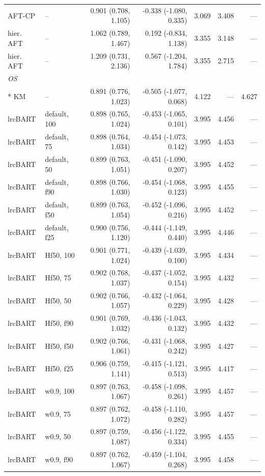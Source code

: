 \begin{landscape}
\begin{longtable}{llrrrrr}
AFT-CP & -- & 0.901 (0.708, 1.105) & -0.338 (-1.080, 0.335) & 3.069 & 3.408 & --- \\
hier. AFT & -- & 1.062 (0.789, 1.467) & 0.192 (-0.834, 1.138) & 3.355 & 3.148 & --- \\
hier. AFT & -- & 1.209 (0.731, 2.136) & 0.567 (-1.204, 1.784) & 3.355 & 2.715 & --- \\
\multicolumn{7}{l}{\strut\textit{OS}}\\*
KM & -- & 0.891 (0.776, 1.023) & -0.505 (-1.077, 0.068) & 4.122 & --- & 4.627 \\
lrcBART & default, 100 & 0.898 (0.765, 1.024) & -0.453 (-1.065, 0.101) & 3.995 & 4.456 & --- \\
lrcBART & default, 75 & 0.898 (0.764, 1.034) & -0.454 (-1.073, 0.142) & 3.995 & 4.453 & --- \\
lrcBART & default, 50 & 0.899 (0.763, 1.051) & -0.451 (-1.090, 0.207) & 3.995 & 4.452 & --- \\
lrcBART & default, f90 & 0.898 (0.766, 1.030) & -0.454 (-1.068, 0.123) & 3.995 & 4.455 & --- \\
lrcBART & default, f50 & 0.899 (0.763, 1.054) & -0.452 (-1.096, 0.216) & 3.995 & 4.452 & --- \\
lrcBART & default, f25 & 0.900 (0.756, 1.120) & -0.444 (-1.149, 0.440) & 3.995 & 4.446 & --- \\
lrcBART & Hf50, 100 & 0.901 (0.771, 1.024) & -0.439 (-1.039, 0.100) & 3.995 & 4.434 & --- \\
lrcBART & Hf50, 75 & 0.902 (0.768, 1.037) & -0.437 (-1.052, 0.154) & 3.995 & 4.432 & --- \\
lrcBART & Hf50, 50 & 0.902 (0.766, 1.057) & -0.432 (-1.064, 0.229) & 3.995 & 4.428 & --- \\
lrcBART & Hf50, f90 & 0.901 (0.769, 1.032) & -0.436 (-1.043, 0.132) & 3.995 & 4.432 & --- \\
lrcBART & Hf50, f50 & 0.902 (0.766, 1.061) & -0.431 (-1.068, 0.242) & 3.995 & 4.427 & --- \\
lrcBART & Hf50, f25 & 0.906 (0.759, 1.141) & -0.415 (-1.121, 0.513) & 3.995 & 4.417 & --- \\
lrcBART & w0.9, 100 & 0.897 (0.763, 1.067) & -0.458 (-1.098, 0.261) & 3.995 & 4.457 & --- \\
lrcBART & w0.9, 75 & 0.897 (0.762, 1.072) & -0.458 (-1.110, 0.282) & 3.995 & 4.457 & --- \\
lrcBART & w0.9, 50 & 0.897 (0.759, 1.087) & -0.456 (-1.122, 0.334) & 3.995 & 4.455 & --- \\
lrcBART & w0.9, f90 & 0.897 (0.762, 1.067) & -0.459 (-1.104, 0.268) & 3.995 & 4.458 & --- \\

\end{longtable}
\end{landscape}
